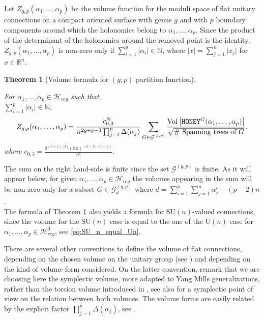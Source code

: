 \documentclass[11pt,a4paper]{amsart}
\providecommand{\U}{\mathrm U}
\providecommand{\SU}{\mathrm {SU}}
\providecommand{\Vol}{\operatorname{Vol}}
\providecommand{\honey}{\texttt{\textsc{HONEY}}}
\numberwithin{equation}{section}
\newtheorem{theorem}{Theorem}[section]
\theoremstyle{definition}
\begin{document}
Let $Z_{g, p}(\alpha_1, \dots, \alpha_p)$ be the volume function for the moduli space of flat unitary connections on a compact oriented surface with genus $g$ and with $p$ boundary components around which the holonomies belong to $\alpha_1,\ldots,\alpha_p$. Since the product of the determinant of the holonomies around the removed point is the identity, $Z_{g, p}(\alpha_1, \dots, \alpha_p)$ is non-zero only if $\sum_{i=1}^p\vert \alpha_i\vert\in \mathbb{N}$, where $\vert x\vert=\sum_{j=1}^n\vert x_j\vert$ for $x\in \mathbb{R}^n$.
\begin{theorem}[Volume formula for $(g, p)$ partition function]
    \label{th:Z_g_p_0}
    
    For $\alpha_1, \dots, \alpha_p\in\mathcal{H}_{reg}$ such that \\ $\sum_{i=1}^p\vert \alpha_i\vert\in \mathbb{N}$, 
    \begin{equation}
        \label{eq:Z_g_p_0}
        Z_{g, p}(\alpha_1, \dots, \alpha_p) = 
        \frac{c_{0,3}^{N}}{n^{2g+p-3}\prod_{j=1}^{p} \Delta(\alpha_j)}
        \sum_{\substack{ G \in \mathcal{G}^{(g,p)}}}
        \frac{\Vol \left[ \honey^G(\alpha_1, 
        \dots, \alpha_p) \right]}{\sqrt{\# \mbox{ Spanning trees of } G}},
    \end{equation}
   where $c_{0,3}=\frac{2^{(n+1)[2]}(2\pi)^{(n-1)(n-2)}}{n!}$.
\end{theorem}

\noindent
The sum on the right hand-side is finite since the set $\mathcal{G}^{(g,p)}$ is finite. 
As it will appear below, for given $\alpha_1, \dots, \alpha_p\in\mathcal{H}_{reg}$ 
the volumes appearing in the sum will be non-zero only for a subset $G\in \mathcal{G}_{d}^{(g,p)}$ 
where $d=\sum_{i=1}^p\sum_{j=1}^n\alpha_j^i-(p-2)n$. 
\\
The formula of Theorem \ref{th:Z_g_p_0} also yields a formula for 
$\SU(n)$-valued connections, since the volume for the $\SU(n)$ case is equal 
to the one of the $\U(n)$ case for $\alpha_1,\ldots,\alpha_p\in\mathcal{H}_{reg}^0$, 
see \eqref{eq:SU_n_equal_Un}. 

There are several other conventions to define the volume of flat connections, depending on the chosen volume on the unitary group (see \cite[Section 4.1]{witten1992two}) and depending on the kind of volume form considered. On the latter convention, remark that we are choosing here the symplectic volume, more adapted to Yang Mills generalizations, rather than the torsion volume introduced in \cite{witten1992two}, see also \cite[Appendix A]{Meinrenken_Woodward} for a symplectic point of view on the relation between both volumes. The volume forms are easily related by the explicit factor $\prod_{j=1}^{p} \Delta(\alpha_j)$, see \cite[Section 4.7]{witten1992two}.
\end{document}
